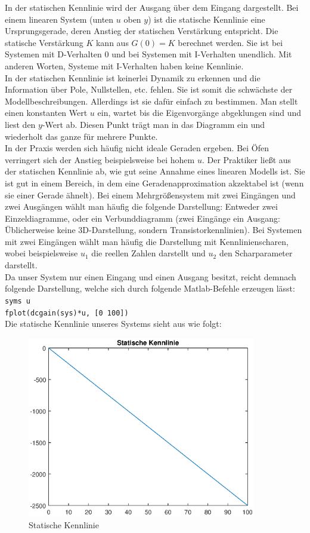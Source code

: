 In der statischen Kennlinie wird der Ausgang über dem Eingang dargestellt. Bei einem linearen System (unten $u$ oben $y$) ist die statische Kennlinie eine Ursprungsgerade, deren Anstieg der statischen Verstärkung entspricht. 
Die statische Verstärkung $K$ kann aus $G(0)=K$ berechnet werden. Sie ist bei Systemen mit D-Verhalten 0 und bei Systemen mit I-Verhalten unendlich. Mit anderen Worten, Systeme mit I-Verhalten haben keine Kennlinie.\\
In der statischen Kennlinie ist keinerlei Dynamik zu erkennen und die Information über Pole, Nullstellen, etc. fehlen. Sie ist somit die schwächste der Modellbeschreibungen. 
Allerdings ist sie dafür einfach zu bestimmen. Man stellt einen konstanten Wert $u$ ein, wartet bis die Eigenvorgänge abgeklungen 
sind und liest den $y$-Wert ab. Diesen Punkt trägt man in das Diagramm ein und wiederholt das ganze für mehrere Punkte.\\
In der Praxis werden sich häufig nicht ideale Geraden ergeben. Bei Öfen verringert sich der Anstieg beispielsweise bei hohem $u$. Der Praktiker ließt aus der statischen Kennlinie ab, wie gut seine Annahme eines linearen Modells ist. Sie ist gut in einem Bereich, in dem eine Geradenapproximation akzektabel ist (wenn sie einer Gerade ähnelt). Bei einem Mehrgrößensystem mit zwei Eingängen und zwei Ausgängen wählt man häufig die folgende Darstellung: Entweder zwei Einzeldiagramme, oder ein Verbunddiagramm (zwei Eingänge ein Ausgang: Üblicherweise keine 3D-Darstellung, sondern Transistorkennlinien). Bei Systemen mit zwei Eingängen 
wählt man häufig die Darstellung mit Kennlinienscharen, wobei beispielsweise $u_{1}$ die reellen Zahlen darstellt und $u_{2}$ den Scharparameter darstellt.\\
Da unser System nur einen Eingang und einen Ausgang besitzt, reicht demnach folgende Darstellung, welche sich durch folgende Matlab-Befehle erzeugen lässt:\\
\hspace*{0.5cm}\texttt{syms u}\\
\hspace*{0.5cm}\texttt{fplot(dcgain(sys)*u, [0 100])}\\
Die statische Kennlinie unseres Systems sieht aus wie folgt:
\begin{figure}[H]
    \centering
    \includegraphics[width=10cm]{images_2/Rest/statische_kennline.eps}
    \caption{Statische Kennlinie}
\end{figure}